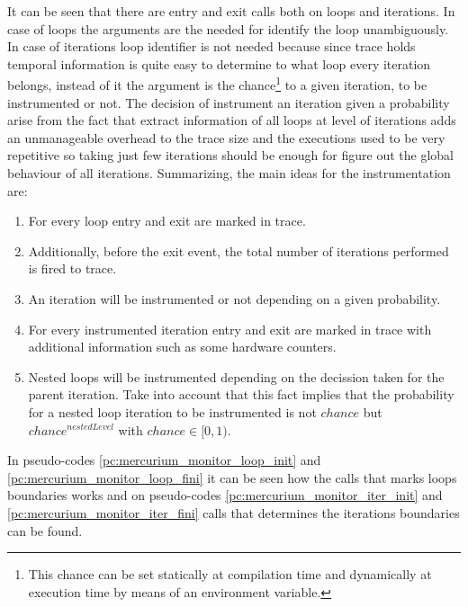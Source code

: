 It can be seen that there are entry and exit calls both on
loops and iterations. In case of loops the arguments are the needed for identify
the loop unambiguously. In case of iterations loop identifier is not needed
because since trace holds temporal information is quite easy to determine to
what loop every iteration belongs, instead of it the argument is the
chance\footnote{This chance can be set statically at compilation time and
dynamically at execution time by means of an environment variable.} to a
given iteration, to be instrumented or not. The decision of
instrument an iteration given a probability arise from the fact that extract
information of all loops at level of iterations adds an unmanageable overhead to
the trace size and the executions used to be very repetitive so taking just few
iterations should be enough for figure out the global behaviour of all
iterations. Summarizing, the main ideas for the instrumentation are:
\begin{enumerate}[label=\roman*)]
  \item For every loop entry and exit are marked in trace.
  \item Additionally, before the exit event, the total number of iterations
    performed is fired to trace.
  \item An iteration will be instrumented or not depending on a given
    probability.
  \item For every instrumented iteration entry and exit are marked in trace 
    with additional information such as some hardware counters.
  \item Nested loops will be instrumented depending on the decission taken for
    the parent iteration. Take into account that this fact implies that the
    probability for a nested loop iteration to be instrumented is not $chance$
    but $chance^{nestedLevel}$ with $chance \in [0,1)$.
\end{enumerate}

In pseudo-codes \ref{pc:mercurium_monitor_loop_init} and
\ref{pc:mercurium_monitor_loop_fini} it can be seen how the calls that marks
loops boundaries works and on pseudo-codes
\ref{pc:mercurium_monitor_iter_init} and \ref{pc:mercurium_monitor_iter_fini}
calls that determines the iterations boundaries can be found. 

